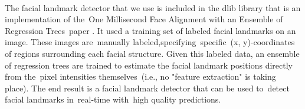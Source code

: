 \paragraph{}
The facial landmark detector that we use is included in the dlib library that is an implementation of the One Millisecond Face Alignment with an Ensemble of Regression Trees paper \cite{lm}.\newline
It used a training set of labeled facial landmarks on an image. These images are manually labeled,specifying specific (x, y)-coordinates of regions surrounding each facial structure.\newline
Given this labeled data, an ensemble of regression trees are trained to estimate the facial landmark positions directly from the pixel intensities themselves (i.e., no "feature extraction" is taking place).\newline
The end result is a facial landmark detector that can be used to detect facial landmarks in real-time with high quality predictions.



